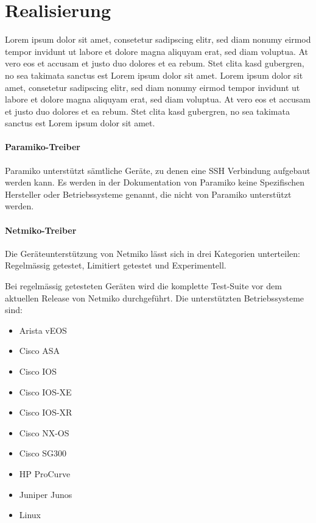 \documentclass[]{subfiles}
\begin{document}
\section{Realisierung}
    Lorem ipsum dolor sit amet, consetetur sadipscing elitr, sed diam nonumy eirmod tempor invidunt ut labore et dolore magna aliquyam erat, sed diam voluptua. At vero eos et accusam et justo duo dolores et ea rebum. Stet clita kasd gubergren, no sea takimata sanctus est Lorem ipsum dolor sit amet. Lorem ipsum dolor sit amet, consetetur sadipscing elitr, sed diam nonumy eirmod tempor invidunt ut labore et dolore magna aliquyam erat, sed diam voluptua. At vero eos et accusam et justo duo dolores et ea rebum. Stet clita kasd gubergren, no sea takimata sanctus est Lorem ipsum dolor sit amet.

    \paragraph{Paramiko-Treiber}
    Paramiko unterstützt sämtliche Geräte, zu denen eine SSH Verbindung aufgebaut werden kann.
    Es werden in der Dokumentation von Paramiko keine Spezifischen Hersteller oder Betriebssysteme
    genannt, die nicht von Paramiko unterstützt werden. 
    
    \paragraph{Netmiko-Treiber}
    Die Geräteunterstützung von Netmiko lässt sich in drei Kategorien unterteilen:
    Regelmässig getestet, Limitiert getestet und Experimentell.
    
    Bei regelmässig getesteten Geräten wird die komplette Test-Suite vor dem aktuellen
    Release von Netmiko durchgeführt. 
    Die unterstützten Betriebssysteme sind:
    
    \begin{itemize}
        \item Arista vEOS
        \item Cisco ASA
        \item Cisco IOS
        \item Cisco IOS-XE
        \item Cisco IOS-XR
        \item Cisco NX-OS
        \item Cisco SG300
        \item HP ProCurve
        \item Juniper Junos
        \item Linux
    \end{itemize}
    
\end{document}
